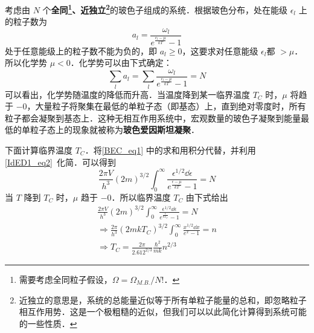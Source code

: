 

考虑由 $N$ 个\textbf{全同\footnote{需要考虑全同粒子假设，$\Omega=\Omega_{M.B.}/N!$．}、近独立\footnote{近独立的意思是，系统的总能量近似等于所有单粒子能量的总和，即忽略粒子相互作用势．这是一个极粗糙的近似，但我们可以以此简化计算得到系统可能的一些性质．}}的玻色子组成的系统．根据玻色分布，处在能级 $\epsilon_l$ 上的粒子数为
\begin{equation}
a_l=\frac{\omega_l}{e^{\frac{\epsilon_l-\mu}{kT}}-1}
\end{equation}
处于任意能级上的粒子数不能为负的，即 $a_l\ge 0$，这要求对任意能级 $\epsilon_l$都 $>\mu$．所以化学势 $\mu<0$．化学势可以由下式确定：
\begin{equation}\label{BEC_eq1}
\sum_la_l=\sum_l \frac{\omega_l}{e^{\frac{\epsilon_l-\mu}{kT}}-1} =N
\end{equation}
可以看出，化学势随温度的降低而升高．当温度降到某一临界温度 $T_C$ 时，$\mu$ 将趋于 $-0$，大量粒子将聚集在最低的单粒子态（即基态）上，直到绝对零度时，所有粒子都会凝聚到基态上．这种无相互作用系统中，宏观数量的玻色子凝聚到能量最低的单粒子态上的现象就被称为\textbf{玻色爱因斯坦凝聚}．

下面计算临界温度 $T_C$．将\autoref{BEC_eq1} 中的求和用积分代替，并利用\autoref{IdED1_eq2}~化简．可以得到
\begin{equation}
\frac{2\pi V}{h^3}(2m)^{3/2}\int_0^\infty \frac{\epsilon^{1/2}\dd \epsilon}{e^{\frac{\epsilon-\mu}{kT}}-1}=N
\end{equation}
当 $T$ 降到 $T_C$ 时，$\mu$ 趋于 $-0$．所以临界温度 $T_C$ 由下式给出
\begin{equation}
\begin{aligned}
\frac{2\pi V}{h^3}(2m)^{3/2}\int_0^\infty \frac{\epsilon^{1/2}\dd \epsilon}{e^{\frac{\epsilon}{kT_C}}-1}=N\\
\Rightarrow \frac{2\pi}{h^3}(2mkT_C)^{3/2}\int_0^\infty \frac{x^{1/2}\dd x}{e^x-1}=n\\
\Rightarrow T_C=\frac{2\pi }{2.612^{2/3}}\frac{\hbar^2}{mk}n^{2/3}
\end{aligned}
\end{equation}